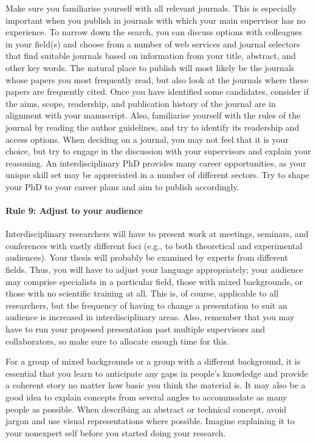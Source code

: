\documentclass[12pt]{report}
\begin{document}
Make sure you familiarise yourself with all relevant journals. This is especially important when you publish in journals with which your main supervisor has no experience. To narrow down the search, you can discuss options with colleagues in your field(s) and choose from a number of web services and journal selectors that find suitable journals based on information from your title, abstract, and other key words. The natural place to publish will most likely be the journals whose papers you most frequently read, but also look at the journals where these papers are frequently cited. Once you have identified some candidates, consider if the aims, scope, readership, and publication history of the journal are in alignment with your manuscript. Also, familiarise yourself with the rules of the journal by reading the author guidelines, and try to identify its readership and access options. When deciding on a journal, you may not feel that it is your choice, but try to engage in the discussion with your supervisors and explain your reasoning. An interdisciplinary PhD provides many career opportunities, as your unique skill set may be appreciated in a number of different sectors. Try to shape your PhD to your career plans and aim to publish accordingly.

\paragraph{Rule 9: Adjust to your audience}

Interdisciplinary researchers will have to present work at meetings, seminars, and conferences with vastly different foci (e.g., to both theoretical and experimental audiences). Your thesis will probably be examined by experts from different fields. Thus, you will have to adjust your language appropriately; your audience may comprise specialists in a particular field, those with mixed backgrounds, or those with no scientific training at all. This is, of course, applicable to all researchers, but the frequency of having to change a presentation to suit an audience is increased in interdisciplinary areas. Also, remember that you may have to run your proposed presentation past multiple supervisors and collaborators, so make sure to allocate enough time for this.

For a group of mixed backgrounds or a group with a different background, it is essential that you learn to anticipate any gaps in people’s knowledge and provide a coherent story no matter how basic you think the material is. It may also be a good idea to explain concepts from several angles to accommodate as many people as possible. When describing an abstract or technical concept, avoid jargon and use visual representations where possible. Imagine explaining it to your nonexpert self before you started doing your research.
\end{document}
